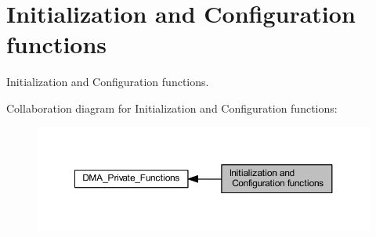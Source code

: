 \hypertarget{group___d_m_a___group1}{}\section{Initialization and Configuration functions}
\label{group___d_m_a___group1}


Initialization and Configuration functions.  


Collaboration diagram for Initialization and Configuration functions\+:\nopagebreak
\begin{figure}[H]
\begin{center}
\leavevmode
\includegraphics[width=350pt]{group___d_m_a___group1}
\end{center}
\end{figure}
